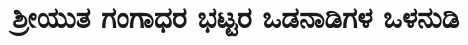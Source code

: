 \documentclass[12pt,twoside,openany]{book}
\begin{document}
\renewcommand\section{\@startsection {section}{1}{\z@}%
                                   {-2.2ex \@plus -1.3ex \@minus -.3ex}%
                                   {1ex \@plus.2ex}%
                                   {\kannadafont\Large\bfseries}}
\renewcommand\chaptermark[1]{\markboth{\kannadafont #1}{}}                                   

\makeatother

\part{ಶ್ರೀಯುತ ಗಂಗಾಧರ ಭಟ್ಟರ ಒಡನಾಡಿಗಳ ಒಳನುಡಿ}





\renewcommand\chaptermark[1]{\markboth{#1}{}}
\lhead[\small\thepage]{\small\dev{\leftmark}}

\makeatletter


\makeatother








\clearpage


\renewcommand\chaptermark[1]{\markboth{#1}{}}

\lhead[\small\thepage]{\small\kan{\leftmark}}

\makeatletter

\end{document}
